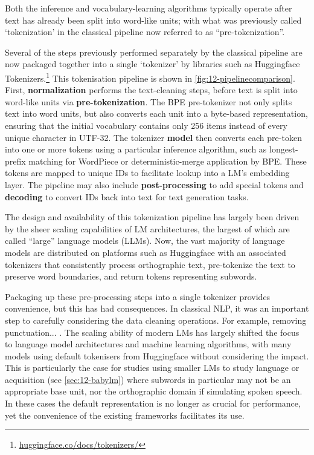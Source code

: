 Both the inference and vocabulary-learning algorithms typically operate after text has already been split into word-like units; with what was previously called `tokenization' in the classical pipeline now referred to as ``pre-tokenization''. 

Several of the steps previously performed separately by the classical pipeline are now packaged together into a single `tokenizer' by libraries such as Huggingface Tokenizers.\footnote{\href{https://huggingface.co/docs/tokenizers/index}{huggingface.co/docs/tokenizers/}} This tokenisation pipeline is shown in \cref{fig:12-pipelinecomparison}. First, \textbf{normalization} performs the text-cleaning steps, before text is split into word-like units via \textbf{pre-tokenization}. The BPE pre-tokenizer not only splits text into word units, but also converts each unit into a byte-based representation, ensuring that the initial vocabulary contains only 256 items instead of every unique character in UTF-32. The tokenizer \textbf{model} then converts each pre-token into one or more tokens using a particular inference algorithm, such as longest-prefix matching for WordPiece or deterministic-merge application by BPE. These tokens are mapped to unique IDs to facilitate lookup into a LM's embedding layer. The pipeline may also include \textbf{post-processing} to add special tokens and \textbf{decoding} to convert IDs back into text for text generation tasks. 

The design and availability of this tokenization pipeline has largely been driven by the sheer scaling capabilities of LM architectures, the largest of which are called ``large'' language models (LLMs). Now, the vast majority of language models are distributed on platforms such as Huggingface with an associated tokenizers that consistently process orthographic text, pre-tokenize the text to preserve word boundaries, and return tokens representing subwords.

Packaging up these pre-processing steps into a single tokenizer provides convenience, but this has had consequences. In classical NLP, it was an important step to carefully considering the data cleaning operations. For example, removing punctuation... \writemore. The scaling ability of modern LMs has largely shifted the focus to language model architectures and machine learning algorithms, with many models using default tokenisers from Huggingface without considering the impact. This is particularly the case for studies using smaller LMs to study language or acquisition (see \cref{sec:12-babylm}) where subwords in particular may not be an appropriate base unit, nor the orthographic domain if simulating spoken speech. In these cases the default representation is no longer as crucial for performance, yet the convenience of the existing frameworks facilitates its use. 

